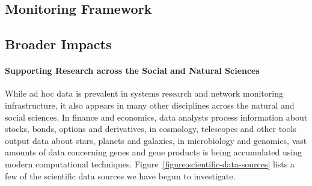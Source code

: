 \documentclass[10pt]{article}
\begin{document}
\subsection{Monitoring Framework}




%

%

\subsection{Broader Impacts}
\label{ssec:impact}


\paragraph*{Supporting Research across the Social and Natural Sciences}
While ad hoc data is prevalent in systems research and network monitoring
infrastructure, it also appears in many other disciplines
across the natural and social sciences. In finance and economics,
data analysts process information about stocks, bonds, options and derivatives,
in cosmology, telescopes and other tools output data about stars, planets and
galaxies, in microbiology and genomics, vast amounts of data concerning
genes and gene products is being accumulated using modern computational techniques.
Figure~\ref{figure:scientific-data-sources} lists a few of the scientific data sources
we have begun to investigate.
\end{document}
